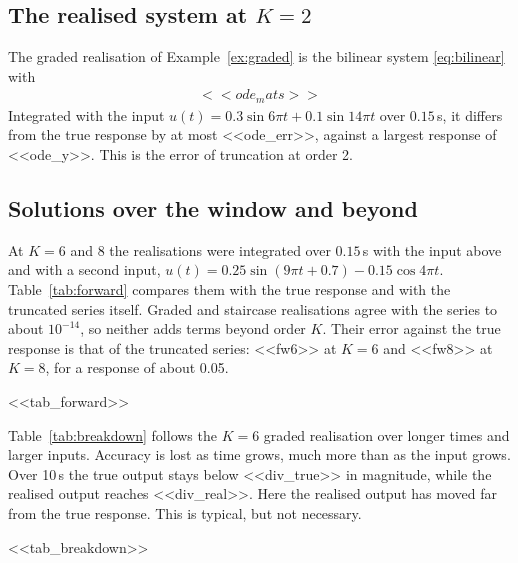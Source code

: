 \documentclass[11pt,a4paper]{article}
\theoremstyle{remark}
\begin{document}
\subsection{The realised system at $K=2$}\label{sec:ode}
The graded realisation of Example~\ref{ex:graded} is the bilinear system \eqref{eq:bilinear} with
\begin{gather*}
<<ode_mats>>
\end{gather*}
Integrated with the input $u(t)=0.3\sin 6\pi t+0.1\sin 14\pi t$ over $0.15$\,s, it differs from the true response by at most <<ode_err>>, against a largest response of <<ode_y>>.
This is the error of truncation at order 2.

\subsection{Solutions over the window and beyond}\label{sec:forward}
At $K=6$ and $8$ the realisations were integrated over $0.15$\,s with the input above and with a second input, $u(t)=0.25\sin(9\pi t+0.7)-0.15\cos 4\pi t$.
Table~\ref{tab:forward} compares them with the true response and with the truncated series itself.
Graded and staircase realisations agree with the series to about $10^{-14}$, so neither adds terms beyond order $K$.
Their error against the true response is that of the truncated series: <<fw6>> at $K=6$ and <<fw8>> at $K=8$, for a response of about 0.05.

\begin{table}[t]\centering\small
\caption{Largest absolute differences over 0.15\,s, exact coefficients.}\label{tab:forward}
<<tab_forward>>
\end{table}

Table~\ref{tab:breakdown} follows the $K=6$ graded realisation over longer times and larger inputs.
Accuracy is lost as time grows, much more than as the input grows.
Over 10\,s the true output stays below <<div_true>> in magnitude, while the realised output reaches <<div_real>>.
Here the realised output has moved far from the true response. This is typical, but not necessary.

\begin{table}[t]\centering\small
\caption{The $K=6$ graded realisation over longer horizons and larger inputs, $u(t)=A(\sin 6\pi t+0.3\sin 14\pi t)$. Entries are $R^2$ against the true response.}\label{tab:breakdown}
<<tab_breakdown>>
\end{table}
\end{document}
